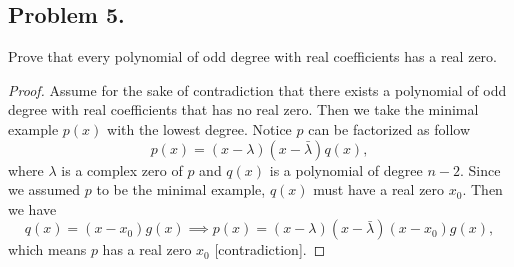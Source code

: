 \documentclass{article}
\begin{document}
\newpage
\subsection*{Problem 5.}
Prove that every polynomial of odd degree with real coefficients has a real zero.
\begin{proof}
    Assume for the sake of contradiction that there exists a polynomial of odd degree with real
    coefficients that has no real zero. Then we take the minimal example $p(x)$ with the 
    lowest degree. Notice $p$ can be factorized as follow 
    $$p(x)=(x-\lambda)(x-\bar{\lambda})q(x),$$
    where $\lambda$ is a complex zero of $p$ and $q(x)$ is a polynomial of degree $n-2$.
    Since we assumed $p$ to be the minimal example, $q(x)$ must have a real zero $x_0$.
    Then we have
    $$q(x)=(x-x_0)g(x)\implies p(x)=(x-\lambda)(x-\bar{\lambda})(x-x_0)g(x),$$
    which means $p$ has a real zero $x_0$ [contradiction].
\end{proof}
\end{document}

